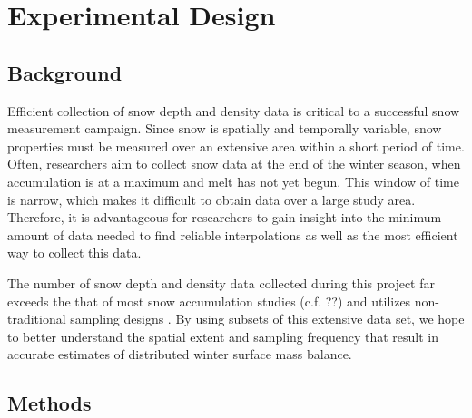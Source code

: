 \documentclass[12pt]{article}
\begin{document}
\section{Experimental Design}
\label{sec:experimentaldesign}

\subsection{Background}

Efficient collection of snow depth and density data is critical to a successful snow measurement campaign. Since snow is spatially and temporally variable, snow properties must be measured over an extensive area within a short period of time. Often, researchers aim to collect snow data at the end of the winter season, when accumulation is at a maximum and melt has not yet begun. This window of time is narrow, which makes it difficult to obtain data over a large study area. Therefore, it is advantageous for researchers to gain insight into the minimum amount of data needed to find reliable interpolations as well as the most efficient way to collect this data. 

The number of snow depth and density data collected during this project far exceeds the that of most snow accumulation studies (c.f. ??) and utilizes non-traditional sampling designs \citep{Shea2010}. By using subsets of this extensive data set, we hope to better understand the spatial extent and sampling frequency that result in accurate estimates of distributed winter surface mass balance.  

\subsection{Methods}
\label{sec:experimentaldesign_methods}
\end{document}
